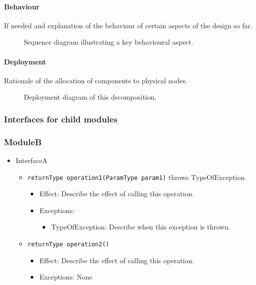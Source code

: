 \documentclass[a4paper,10pt]{article}
\begin{document}
\paragraph{Behaviour}
If needed and explanation of the behaviour of certain aspects of the design so
far.

\begin{figure}[!htp]
    \centering
    \caption{Sequence diagram illustrating a key behavioural aspect.
        }\label{fig:it1-seq_aspect1}
\end{figure}

\paragraph{Deployment}
Rationale of the allocation of components to physical nodes.

\begin{figure}[!htp]
    \centering
    \caption{Deployment diagram of this decomposition.
        }\label{fig:it1-depl_main}
\end{figure}

\subsubsection{Interfaces for child modules}
\subsubsection*{ModuleB}
\begin{itemize}
    \item InterfaceA
    \begin{itemize}
        \item \texttt{returnType operation1(ParamType param1)} throws TypeOfException
        \begin{itemize}
            \item Effect: Describe the effect of calling this operation.
            \item Exceptions: 
            \begin{itemize}
                \item TypeOfException: Describe when this exception is thrown.
            \end{itemize}
        \end{itemize}

        \item \texttt{returnType operation2()}
        \begin{itemize}
            \item Effect: Describe the effect of calling this operation.
            \item Exceptions: None
         \end{itemize}
    \end{itemize}
\end{itemize}
\end{document}
